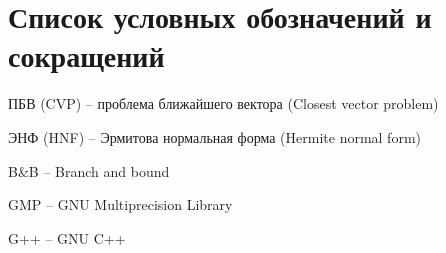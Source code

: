 \newpage

\section{Список условных обозначений и сокращений}

ПБВ (CVP) -- проблема ближайшего вектора (Closest vector problem)

ЭНФ (HNF) -- Эрмитова нормальная форма (Hermite normal form)

B\&B -- Branch and bound

GMP -- GNU Multiprecision Library

G++ -- GNU C++


\clearpage
